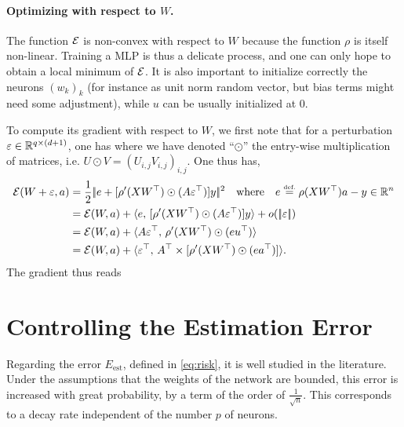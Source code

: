 \paragraph{Optimizing with respect to $W$.}

The function $\mathcal{E}$ is non-convex with respect to $W$ because the function $\rho$ is itself non-linear. 
%
Training a MLP is thus a delicate process, and one can only hope to obtain a local minimum of $\mathcal{E}$. It is also important to initialize correctly the neurons $(w_k)_k$ (for instance as unit norm random vector, but bias terms might need some adjustment), while $u$ can be usually initialized at $0$.

To compute its gradient with respect to $W$, we first note that for a perturbation $\varepsilon \in \mathbb{R}^{q \times (d+1)}$, one has 
where we have denoted ``$\odot$'' the entry-wise multiplication of matrices, i.e. $U \odot V = (U_{i,j} V_{i,j})_{i,j}$.
%
One thus has, 
\begin{align*}
	\mathcal{E}(W+\varepsilon,a) &= \frac{1}{2}|\!| e+[\rho'(XW^\top)\odot(A\varepsilon^\top)] y |\!|^2
		\quad \text{where} \quad e \stackrel{\mbox{\upshape\tiny def.}}{=} \rho(XW^\top)a- y \in \mathbb{R}^n \\
		&= \mathcal{E}(W,a) + \langle e,\,[\rho'(XW^\top)\odot(A\varepsilon^\top)] y\rangle + o(|\!| \varepsilon |\!|) \\
		&= \mathcal{E}(W,a) + \langle A \varepsilon^\top,\,\rho'(XW^\top)\odot (e u^\top)\rangle \\
		&= \mathcal{E}(W,a) + \langle \varepsilon^\top,\,A^\top \times [\rho'(XW^\top)\odot (e a^\top)]\rangle.
\end{align*}
The gradient thus reads


\section{Controlling the Estimation Error}

Regarding the error $E_{\text{est}}$, defined in \eqref{eq:risk}, it is well studied in the literature. Under the assumptions that the weights of the network are bounded, this error is increased with great probability, by a term of the order of $\frac{1}{\sqrt{n}}$. This corresponds to a decay rate independent of the number $ p $ of neurons.

